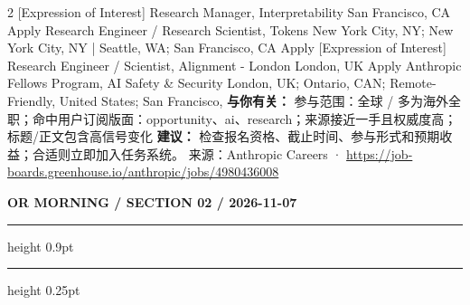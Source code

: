 \documentclass[10.5pt]{ctexart}
\begin{document}
\begin{multicols}{2}
[Expression of Interest] Research Manager, Interpretability San Francisco, CA Apply Research Engineer / Research Scientist, Tokens New York City, NY; New York City, NY | Seattle, WA; San Francisco, CA Apply [Expression of Interest] Research Engineer / Scientist, Alignment - London London, UK Apply Anthropic Fellows Program, AI Safety \& Security London, UK; Ontario, CAN; Remote-Friendly, United States; San Francisco, 
\textbf{与你有关：} 参与范围：全球 / 多为海外全职；命中用户订阅版面：opportunity、ai、research；来源接近一手且权威度高；标题/正文包含高信号变化
\textbf{建议：} 检查报名资格、截止时间、参与形式和预期收益；合适则立即加入任务系统。
{\footnotesize\color{ormuted} 来源：Anthropic Careers · \url{https://job-boards.greenhouse.io/anthropic/jobs/4980436008}}
\end{multicols}
\newpage
{\small\bfseries OR MORNING / SECTION 02 / 2026-11-07}
\vspace{2mm}
\hrule height 0.9pt
\vspace{1.5mm}
\hrule height 0.25pt
\vspace{4mm}
\end{document}

